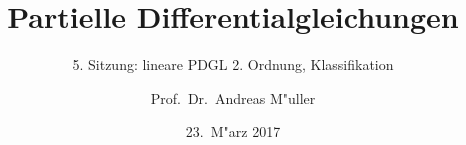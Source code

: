 \documentclass{beamer}
\title[]{Partielle Differentialgleichungen}
\subtitle{5. Sitzung: lineare PDGL 2. Ordnung, Klassifikation}
\date[23.~M"arz 2017]{23.~M"arz 2017}
\author{Prof.~Dr.~Andreas M"uller}
\begin{document}
\begin{frame}
\titlepage
\end{frame}


\end{document}
